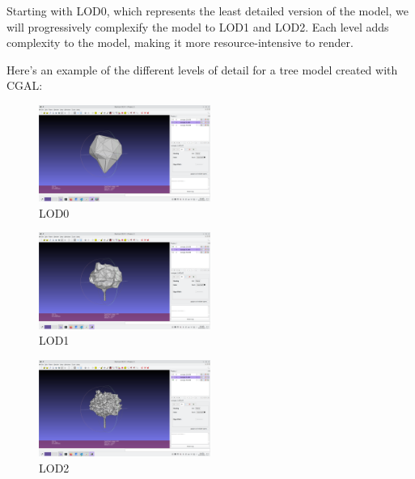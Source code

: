 \documentclass[12pt]{article}
\begin{document}
Starting with LOD0, which represents the least detailed version of the model,
we will progressively complexify the model to LOD1 and LOD2.
Each level adds complexity to the model, making it more
resource-intensive to render.

Here's an example of the different levels of detail for a tree model created
with CGAL:

\begin{figure}[H]
    \vspace{1.5cm}
    \centering
    \includegraphics[width=0.5\textwidth]{images/LOD0.png}
    \caption{LOD0}
\end{figure}

\begin{figure}[H]
    \vspace{1.5cm}
    \centering
    \includegraphics[width=0.5\textwidth]{images/LOD1.png}
    \caption{LOD1}
\end{figure}

\begin{figure}[H]
    \vspace{1.5cm}
    \centering
    \includegraphics[width=0.5\textwidth]{images/LOD2.png}
    \caption{LOD2}
\end{figure}
\end{document}
